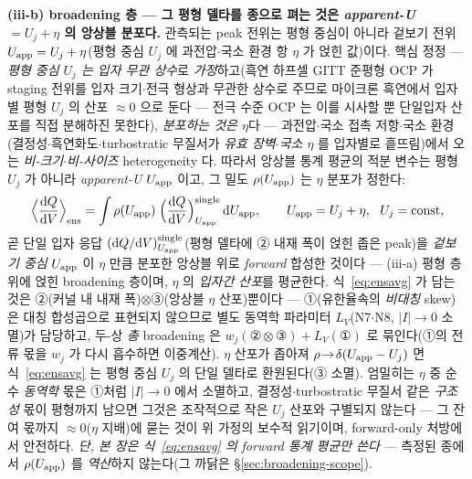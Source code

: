 \textbf{(iii-b) broadening 층 --- 그 평형 델타를 종으로 펴는 것은 \emph{apparent-U $=U_j+\eta$} 의 앙상블 분포다.} 관측되는 peak
전위는 평형 중심이 아니라 겉보기 전위 $U_{\mathrm{app}}=U_j+\eta$(평형 중심 $U_j$ 에 과전압$\cdot$국소 환경 항 $\eta$ 가 얹힌
값)이다. 핵심 정정 --- \emph{평형 중심 $U_j$ 는 입자 무관 상수}로 \emph{가정}하고(흑연 하프셀 GITT 준평형 OCP 가 staging 전위를
입자 크기$\cdot$전극 형상과 무관한 상수로 주므로\cite{park2021} 마이크론 흑연에서 입자별 평형 $U_j$ 의 산포 $\approx0$ 으로 둔다 ---
전극 수준 OCP 는 이를 시사할 뿐 단일입자 산포를 직접 분해하진 못한다), \emph{분포하는 것은 $\eta$}다 ---
과전압$\cdot$국소 접촉 저항$\cdot$국소 환경(결정성$\cdot$흑연화도$\cdot$turbostratic 무질서가 \emph{유효 장벽$\cdot$국소
$\eta$} 를 입자별로 흩뜨림)에서 오는 \emph{비-크기$\cdot$비-사이즈} heterogeneity 다. 따라서 앙상블 통계 평균의 적분
변수는 평형 $U_j$ 가 아니라 \emph{apparent-U} $U_{\mathrm{app}}$ 이고, 그 밀도 $\rho(U_{\mathrm{app}})$ 는 $\eta$ 분포가 정한다:
\begin{equation}
\Big\langle\frac{\mathrm{d} Q}{\mathrm{d} V}\Big\rangle_\mathrm{ens}
=\int \rho(U_{\mathrm{app}})\;\Big(\frac{\mathrm{d} Q}{\mathrm{d} V}\Big)^\mathrm{single}_{U_{\mathrm{app}}}\,\mathrm{d} U_{\mathrm{app}},
\qquad U_{\mathrm{app}}=U_j+\eta,\ \ U_j=\text{const},
\label{eq:ensavg}
\end{equation}
곧 단일 입자 응답 $(\mathrm{d} Q/\mathrm{d} V)^\mathrm{single}_{U_{\mathrm{app}}}$(평형 델타에 ② 내재 폭이 얹힌 좁은 peak)을 \emph{겉보기 중심}
$U_{\mathrm{app}}$ 이 $\eta$ 만큼 분포한 앙상블 위로 \emph{forward} 합성한 것이다 --- (iii-a) 평형 층 위에 얹힌
broadening 층이며, $\eta$ 의 \emph{입자간 산포}를 평균한다. 식~\eqref{eq:ensavg} 가 담는 것은
②(커널 내 내재 폭)$\otimes$③(앙상블 $\eta$ 산포)뿐이다 --- ①(유한율속의 \emph{비대칭} skew)은 대칭 합성곱으로
표현되지 않으므로 별도 동역학 파라미터 $L_V$(N7$\cdot$N8, $|I|\!\to\!0$ 소멸)가 담당하고, 두-상 \emph{총}
broadening 은 $w_j(\text{②}\otimes\text{③})+L_V(\text{①})$ 로 묶인다(①의 전류 몫을 $w_j$ 가 다시 흡수하면
이중계산). $\eta$ 산포가 좁아져 $\rho\!\to\!\delta(U_{\mathrm{app}}-U_j)$ 면 식~\eqref{eq:ensavg} 는 평형 중심 $U_j$
의 단일 델타로 환원된다(③ 소멸).
엄밀히는 $\eta$ 중 순수 \emph{동역학} 몫은 ①처럼 $|I|\!\to\!0$ 에서 소멸하고, 결정성$\cdot$turbostratic 무질서 같은
\emph{구조성} 몫이 평형까지 남으면 그것은 조작적으로 작은 $U_j$ 산포와 구별되지 않는다 --- 그 잔여 몫까지
$\approx0$($\eta$ 지배)에 묻는 것이 위 가정의 보수적 읽기이며, forward-only 처방에서 안전하다. \emph{단, 본 장은 식~\eqref{eq:ensavg} 의 forward 통계 평균만
쓴다} --- 측정된 종에서 $\rho(U_{\mathrm{app}})$ 를 \emph{역산}하지 않는다(그 까닭은 \S\ref{sec:broadening-scope}).

